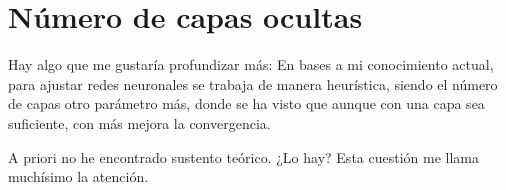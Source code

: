 %
\section{Número de capas ocultas}\label{ch:ideas_numero_capas_ocultas}

Hay algo que me gustaría profundizar más: 
En bases a mi conocimiento actual, para ajustar redes neuronales se trabaja de manera 
heurística, siendo el número de capas otro parámetro más, donde se ha visto
que aunque con una capa sea suficiente, con más mejora la convergencia. 

A priori no he encontrado sustento teórico. 
¿Lo hay?
Esta cuestión me llama muchísimo la atención.
